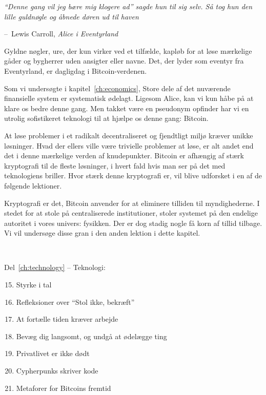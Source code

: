 \documentclass[paper=6in:9in,pagesize=pdftex,headinclude=on,footinclude=on,12pt]{scrbook}
\makeatletter
\newenvironment{chapquote}[2][4em]{\setlength{\@tempdima}{#1}%
   \def\chapquote@author{#2}%
   \parshape 1 \@tempdima \dimexpr\textwidth-2\@tempdima\relax%
   \itshape}{\par\normalfont\hfill--\ \chapquote@author\hspace*{\@tempdima}\par\bigskip}
\makeatother
\begin{document}
\begin{chapquote}{Lewis Carroll, \textit{Alice i Eventyrland}} \enquote{Denne gang vil jeg bære mig klogere ad} sagde hun til sig selv. Så tog hun den lille guldnøgle og åbnede døren ud til haven \end{chapquote}

Gyldne nøgler, ure, der kun virker ved et tilfælde, kapløb for at løse mærkelige gåder og bygherrer uden ansigter eller navne. Det, der lyder som eventyr fra Eventyrland, er dagligdag i Bitcoin-verdenen.

Som vi undersøgte i kapitel~\ref{ch:economics}, Store dele af det nuværende finansielle system er systematisk ødelagt. Ligesom Alice, kan vi kun håbe på at klare os bedre denne gang. Men takket være en pseudonym opfinder har vi en utrolig sofistikeret teknologi til at hjælpe os denne gang: Bitcoin.

At løse problemer i et radikalt decentraliseret og fjendtligt miljø kræver unikke løsninger. Hvad der ellers ville være trivielle problemer at løse, er alt andet end det i denne mærkelige verden af knudepunkter. Bitcoin er afhængig af stærk kryptografi til de fleste løsninger, i hvert fald hvis man ser på det med teknologiens briller. Hvor stærk denne kryptografi er, vil blive udforsket i en af de følgende lektioner.

Kryptografi er det, Bitcoin anvender for at eliminere tilliden til myndighederne. I stedet for at stole på centraliserede institutioner, stoler systemet på den endelige autoritet i vores univers: fysikken. Der er dog stadig nogle få korn af tillid tilbage. Vi vil undersøge disse gran i den anden lektion i dette kapitel.

~\begin{samepage} Del~\ref{ch:technology} -- Teknologi:\begin{enumerate}
  \setcounter{enumi}{14}
  \item Styrke i tal \item Refleksioner over \enquote{Stol ikke, bekræft} \item At fortælle tiden kræver arbejde \item Bevæg dig langsomt, og undgå at ødelægge ting \item Privatlivet er ikke dødt \item Cypherpunks skriver kode \item Metaforer for Bitcoins fremtid \end{enumerate}
\end{samepage}
\end{document}
